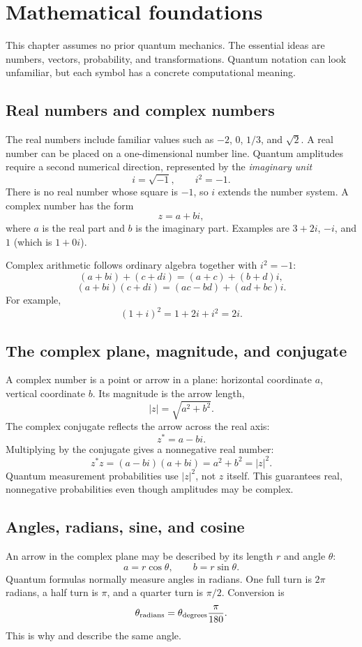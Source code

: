 \section{Mathematical foundations}

This chapter assumes no prior quantum mechanics. The essential ideas are
numbers, vectors, probability, and transformations. Quantum notation can look
unfamiliar, but each symbol has a concrete computational meaning.

\subsection{Real numbers and complex numbers}

The real numbers include familiar values such as $-2$, $0$, $1/3$, and
$\sqrt2$. A real number can be placed on a one-dimensional number line.
Quantum amplitudes require a second numerical direction, represented by the
\emph{imaginary unit}
\[
i=\sqrt{-1},\qquad i^2=-1.
\]
There is no real number whose square is $-1$, so $i$ extends the number system.
A complex number has the form
\[
z=a+bi,
\]
where $a$ is the real part and $b$ is the imaginary part. Examples are
$3+2i$, $-i$, and $1$ (which is $1+0i$).

Complex arithmetic follows ordinary algebra together with $i^2=-1$:
\[
(a+bi)+(c+di)=(a+c)+(b+d)i,
\]
\[
(a+bi)(c+di)=(ac-bd)+(ad+bc)i.
\]
For example,
\[
(1+i)^2=1+2i+i^2=2i.
\]

\subsection{The complex plane, magnitude, and conjugate}

A complex number is a point or arrow in a plane: horizontal coordinate $a$,
vertical coordinate $b$. Its magnitude is the arrow length,
\[
|z|=\sqrt{a^2+b^2}.
\]
The complex conjugate reflects the arrow across the real axis:
\[
z^*=a-bi.
\]
Multiplying by the conjugate gives a nonnegative real number:
\[
z^*z=(a-bi)(a+bi)=a^2+b^2=|z|^2.
\]
Quantum measurement probabilities use $|z|^2$, not $z$ itself. This guarantees
real, nonnegative probabilities even though amplitudes may be complex.

\subsection{Angles, radians, sine, and cosine}

An arrow in the complex plane may be described by its length $r$ and angle
$\theta$:
\[
a=r\cos\theta,\qquad b=r\sin\theta.
\]
Quantum formulas normally measure angles in radians. One full turn is $2\pi$
radians, a half turn is $\pi$, and a quarter turn is $\pi/2$. Conversion is
\[
\theta_{\rm radians}=\theta_{\rm degrees}\frac{\pi}{180}.
\]
This is why  and  describe the same angle.

